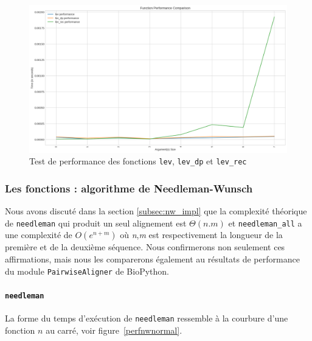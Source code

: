 \documentclass[12pt]{article}
\begin{document}
    \begin{figure}[!h]
        \centering
        \includegraphics[scale=0.4]{Images/Performance/Levenshtein/performance_levenshtein_rec.png}
        \caption{Test de performance des fonctions \texttt{lev}, \texttt{lev\_dp} et \texttt{lev\_rec}}
        \label{perflevrec}
    \end{figure}

\newpage

\subsubsection{Les fonctions : algorithme de Needleman-Wunsch}
Nous avons discuté dans la section \ref{subsec:nw_impl} que la complexité théorique de \texttt{needleman} qui produit un seul alignement est $\Theta(n.m)$ et \texttt{needleman\_all} a une complexité de $O(e^{n+m})$ où \textsl{n},\textsl{m} est respectivement la longueur de la première et de la deuxième séquence. 
Nous confirmerons non seulement ces affirmations, mais nous les comparerons également au résultats de performance du module \texttt{PairwiseAligner} de BioPython.
\paragraph{\texttt{needleman}}
La forme du temps d'exécution de \texttt{needleman} ressemble à la courbure d'une fonction $n$ au carré, voir figure~\ref{perfnwnormal}. 

\newpage
\end{document}
